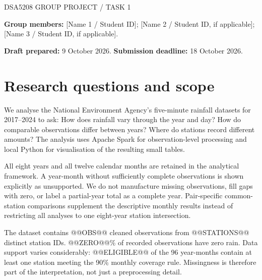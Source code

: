 \documentclass[10pt,a4paper]{article}
\newcommand{\finding}[1]{\par\smallskip{\color{teal}\bfseries Key observation.} #1\par\smallskip}
\begin{document}
{\color{teal}\small DSA5208 GROUP PROJECT / TASK 1}\par
\vspace{4mm}{\Huge\bfseries Rainfall across Singapore}\par
\vspace{2mm}{\Large Exploring time, place and observational gaps}\par
\vspace{4mm}\textbf{Group members:} [Name 1 / Student ID]; [Name 2 / Student ID, if applicable]; [Name 3 / Student ID, if applicable].

\textbf{Draft prepared:} 9 October 2026. \textbf{Submission deadline:} 18 October 2026.

\section{Research questions and scope}
We analyse the National Environment Agency's five-minute rainfall datasets for 2017--2024 to ask: How does rainfall vary through the year and day? How do comparable observations differ between years? Where do stations record different amounts? The analysis uses Apache Spark for observation-level processing and local Python for visualisation of the resulting small tables.

All eight years and all twelve calendar months are retained in the analytical framework. A year-month without sufficiently complete observations is shown explicitly as unsupported. We do not manufacture missing observations, fill gaps with zero, or label a partial-year total as a complete year. Pair-specific common-station comparisons supplement the descriptive monthly results instead of restricting all analyses to one eight-year station intersection.

\finding{The dataset contains @@OBS@@ cleaned observations from @@STATIONS@@ distinct station IDs. @@ZERO@@\% of recorded observations have zero rain. Data support varies considerably: @@ELIGIBLE@@ of the 96 year-months contain at least one station meeting the 90\% monthly coverage rule. Missingness is therefore part of the interpretation, not just a preprocessing detail.}
\end{document}
